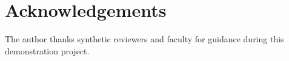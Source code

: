 \chapter*{Acknowledgements}
The author thanks synthetic reviewers and faculty for guidance during this
demonstration project.
